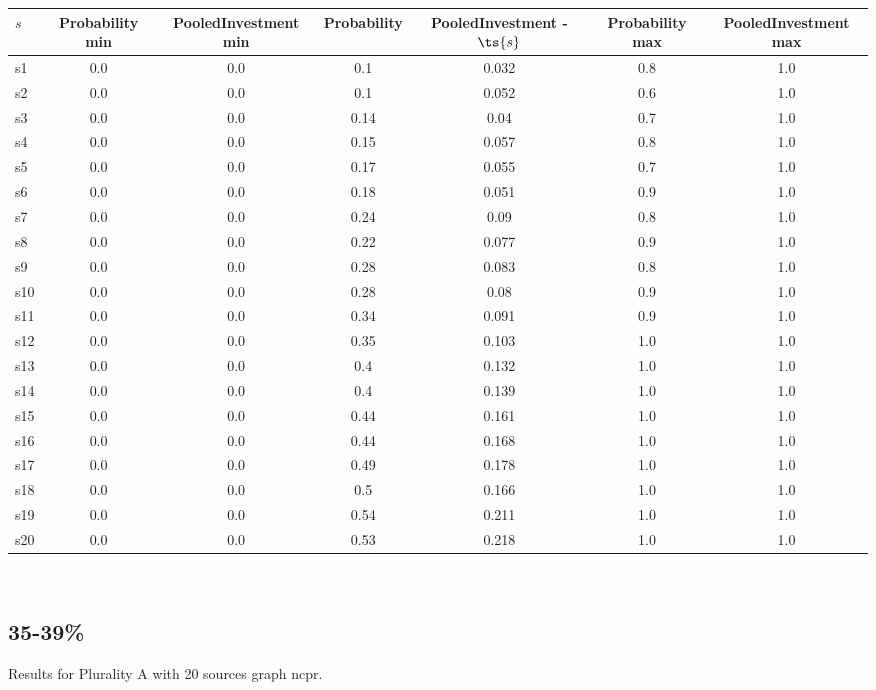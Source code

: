 \documentclass{article}
\begin{document}
\noindent\begin{tabular}{|l|c|c|c|c|c|c|}
\hline
$s$& Probability min & PooledInvestment min & Probability & PooledInvestment - $\ts{s}$ & Probability max & PooledInvestment max\\
\hline
s1 &0.0 & 0.0 & 0.1 & 0.032 & 0.8 & 1.0\\
\hline
s2 &0.0 & 0.0 & 0.1 & 0.052 & 0.6 & 1.0\\
\hline
s3 &0.0 & 0.0 & 0.14 & 0.04 & 0.7 & 1.0\\
\hline
s4 &0.0 & 0.0 & 0.15 & 0.057 & 0.8 & 1.0\\
\hline
s5 &0.0 & 0.0 & 0.17 & 0.055 & 0.7 & 1.0\\
\hline
s6 &0.0 & 0.0 & 0.18 & 0.051 & 0.9 & 1.0\\
\hline
s7 &0.0 & 0.0 & 0.24 & 0.09 & 0.8 & 1.0\\
\hline
s8 &0.0 & 0.0 & 0.22 & 0.077 & 0.9 & 1.0\\
\hline
s9 &0.0 & 0.0 & 0.28 & 0.083 & 0.8 & 1.0\\
\hline
s10 &0.0 & 0.0 & 0.28 & 0.08 & 0.9 & 1.0\\
\hline
s11 &0.0 & 0.0 & 0.34 & 0.091 & 0.9 & 1.0\\
\hline
s12 &0.0 & 0.0 & 0.35 & 0.103 & 1.0 & 1.0\\
\hline
s13 &0.0 & 0.0 & 0.4 & 0.132 & 1.0 & 1.0\\
\hline
s14 &0.0 & 0.0 & 0.4 & 0.139 & 1.0 & 1.0\\
\hline
s15 &0.0 & 0.0 & 0.44 & 0.161 & 1.0 & 1.0\\
\hline
s16 &0.0 & 0.0 & 0.44 & 0.168 & 1.0 & 1.0\\
\hline
s17 &0.0 & 0.0 & 0.49 & 0.178 & 1.0 & 1.0\\
\hline
s18 &0.0 & 0.0 & 0.5 & 0.166 & 1.0 & 1.0\\
\hline
s19 &0.0 & 0.0 & 0.54 & 0.211 & 1.0 & 1.0\\
\hline
s20 &0.0 & 0.0 & 0.53 & 0.218 & 1.0 & 1.0\\
\hline
\end{tabular}\\

\newpage

\subsection{35-39\%}

\noindent Results for Plurality A with 20 sources graph ncpr.
\end{document}
